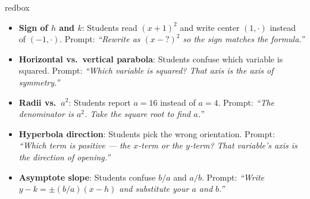 \documentclass[10pt]{article}
\begin{document}
\begin{skillbox}{redbox}
\begin{itemize}[leftmargin=1.4em, itemsep=3pt]
  \item \textbf{Sign of $h$ and $k$}: Students read $(x+1)^2$ and write center
    $(1, \cdot)$ instead of $(-1, \cdot)$. Prompt: \textit{``Rewrite as
    $(x - ?)^2$ so the sign matches the formula.''}
  \item \textbf{Horizontal vs.\ vertical parabola}: Students confuse which
    variable is squared. Prompt: \textit{``Which variable is squared? That
    axis is the axis of symmetry.''}
  \item \textbf{Radii vs.\ $a^2$}: Students report $a = 16$ instead of $a = 4$.
    Prompt: \textit{``The denominator is $a^2$. Take the square root to find $a$.''}
  \item \textbf{Hyperbola direction}: Students pick the wrong orientation.
    Prompt: \textit{``Which term is positive --- the $x$-term or the $y$-term?
    That variable's axis is the direction of opening.''}
  \item \textbf{Asymptote slope}: Students confuse $b/a$ and $a/b$. Prompt:
    \textit{``Write $y - k = \pm(b/a)(x-h)$ and substitute your $a$ and $b$.''}
\end{itemize}
\end{skillbox}

\vspace{0.08in}
\end{document}
